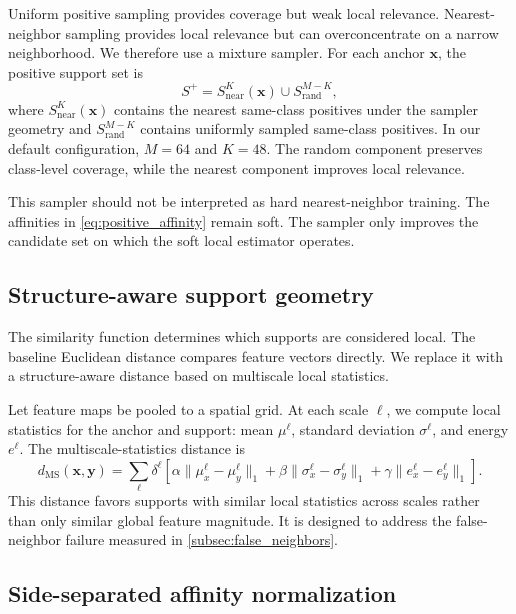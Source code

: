 \documentclass{article}
\newcommand{\x}{\mathbf{x}}
\newcommand{\y}{\mathbf{y}}
\newcommand{\dms}{d_{\mathrm{MS}}}
\begin{document}
Uniform positive sampling provides coverage but weak local relevance.
Nearest-neighbor sampling provides local relevance but can overconcentrate on a narrow neighborhood.
We therefore use a mixture sampler.
For each anchor $\x$, the positive support set is
\begin{equation}
S^+
=
S_{\mathrm{near}}^{K}(\x)
\cup
S_{\mathrm{rand}}^{M-K},
\label{eq:positive_enhanced_sampler}
\end{equation}
where $S_{\mathrm{near}}^{K}(\x)$ contains the nearest same-class positives under the sampler geometry and $S_{\mathrm{rand}}^{M-K}$ contains uniformly sampled same-class positives.
In our default configuration, $M=64$ and $K=48$.
The random component preserves class-level coverage, while the nearest component improves local relevance.

This sampler should not be interpreted as hard nearest-neighbor training.
The affinities in \cref{eq:positive_affinity} remain soft.
The sampler only improves the candidate set on which the soft local estimator operates.

\subsection{Structure-aware support geometry}
\label{subsec:structure_aware_geometry}

The similarity function determines which supports are considered local.
The baseline Euclidean distance compares feature vectors directly.
We replace it with a structure-aware distance based on multiscale local statistics.

Let feature maps be pooled to a spatial grid.
At each scale $\ell$, we compute local statistics for the anchor and support: mean $\mu^\ell$, standard deviation $\sigma^\ell$, and energy $e^\ell$.
The multiscale-statistics distance is
\begin{equation}
\dms(\x,\y)
=
\sum_{\ell}
\delta^\ell
\left[
\alpha
\|\mu_x^\ell-\mu_y^\ell\|_1
+
\beta
\|\sigma_x^\ell-\sigma_y^\ell\|_1
+
\gamma
\|e_x^\ell-e_y^\ell\|_1
\right].
\label{eq:multiscale_statistics_distance}
\end{equation}
This distance favors supports with similar local statistics across scales rather than only similar global feature magnitude.
It is designed to address the false-neighbor failure measured in \cref{subsec:false_neighbors}.

\subsection{Side-separated affinity normalization}
\label{subsec:side_separated_weights}
\end{document}
